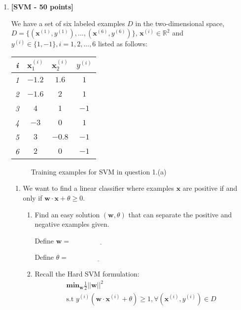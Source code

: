 \begin{enumerate}

\item {\bf [SVM - 50 points]}

\pp
We have a set of six labeled examples $D$ in the two-dimensional space, $D = \{(\mathbf{x}^{(1)}, y^{(1)}),...,(\mathbf{x}^{(6)}, y^{(6)})\}$, $\mathbf{x}^{(i)} \in \mathbb{R}^{2}$ and $y^{(i)} \in \{1, -1\}, i=1,2,...,6$ listed as follows:
  \begin{center}
    \begin{tabular}{|c|c|c|c|}
      \hline
      {\em i}  & $\mathbf{x}_1^{(i)}$  & $\mathbf{x}_2^{(i)}$ & $y^{(i)}$ \\
      \hline
      {\em 1}  & $-1.2$  & $1.6$ & $1$ \\
      \hline
      {\em 2}  & $-1.6$  & $2$ & $1$ \\
      \hline
      {\em 3}  & $4$  & $1$ & $-1$ \\
      \hline
      {\em 4}  & $-3$  & $0$ & $1$ \\
      \hline
      {\em 5}  & $3$  & $-0.8$ & $-1$ \\
      \hline
      {\em 6}  & $2$  & $0$ & $-1$ \\
      \hline
    \end{tabular}
  \end{center}
  \begin{figure}[h!]
        \begin{center}
         \hspace{5cm}
          \caption{Training examples for SVM in question 1.(a)}
          \label{fig:1-500}
        \end{center}
      \end{figure}
\begin{enumerate}
\item[(a)][$20$ points]
We want to find a linear classifier where examples $\mathbf{x}$ are positive if and only if $\mathbf{w}\cdot \mathbf{x} + \theta \geq 0$.

\begin{enumerate}
\item[1.][$3$ points] Find an easy solution $(\mathbf{w}, \theta)$ that can separate the positive and negative examples given.

\vspace{.13in}
Define $\mathbf{w}=$ $\underline{\qquad\qquad\qquad\qquad}$

\vspace{.13in}
Define $\theta =$ $\underline{\qquad\qquad\qquad\qquad}$
\vspace{.13in}
\item[2.][$10$ points] Recall the Hard SVM formulation:
\begin{gather}
\textbf{min}_{\mathbf{w}}\frac{1}{2}||\mathbf{w}||^2 \\
\text{s.t  } y^{(i)}(\mathbf{w}\cdot\mathbf{x}^{(i)}+\theta)\geq 1, \forall (\mathbf{x}^{(i)},y^{(i)})\in D
\end{gather}


\end{enumerate}
\end{enumerate}
\end{enumerate}

